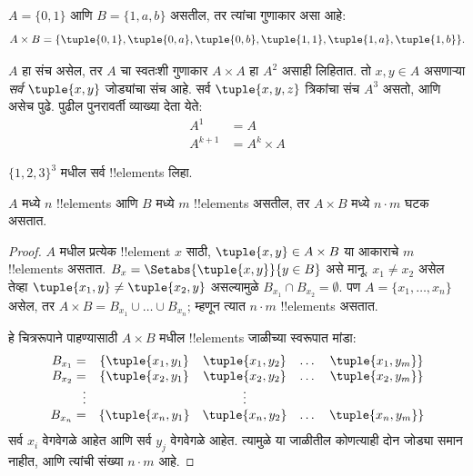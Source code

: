 \documentclass[../../../include/open-logic-section]{subfiles}
\begin{document}
\begin{ex}
$A = \{0, 1\}$ आणि $B = \{1, a, b\}$ असतील, तर त्यांचा गुणाकार असा आहे:
\[
A \times B = \{ \tuple{0, 1}, \tuple{0, a}, \tuple{0, b},
    \tuple{1, 1}, \tuple{1, a}, \tuple{1, b} \}.
\]
\end{ex}

\begin{ex}
$A$ हा संच असेल, तर $A$ चा स्वतःशी गुणाकार $A \times A$ हा $A^2$
असाही लिहितात. तो $x, y \in A$ असणाऱ्या \emph{सर्व} $\tuple{x, y}$ जोड्यांचा
संच आहे. सर्व $\tuple{x, y, z}$ त्रिकांचा संच $A^3$ असतो, आणि असेच पुढे.
पुढील पुनरावर्ती व्याख्या देता येते:
\begin{align*}
  A^1 & = A\\
  A^{k+1} & = A^k \times A
\end{align*}
\end{ex}

\begin{prob}
$\{1, 2, 3\}^3$ मधील सर्व !!{element}s लिहा.
\end{prob}

\begin{prop}
$A$ मध्ये $n$ !!{element}s आणि $B$ मध्ये $m$ !!{element}s असतील,
तर $A
\times B$ मध्ये $n\cdot m$ घटक असतात.
\end{prop}

\begin{proof}
$A$ मधील प्रत्येक !!{element} $x$ साठी, $\tuple{x, y} \in A \times B$
या आकाराचे $m$ !!{element}s असतात.
$B_x = \Setabs{\tuple{x, y}}{y
  \in B}$ असे मानू. $x_1 \neq x_2$ असेल तेव्हा $\tuple{x_1, y} \neq
\tuple{x_2, y}$ असल्यामुळे $B_{x_1} \cap B_{x_2} = \emptyset$.
पण $A = \{x_1,
\dots, x_n\}$ असेल, तर $A \times B = B_{x_1} \cup \dots \cup B_{x_n}$;
म्हणून त्यात $n\cdot m$ !!{element}s असतात.

हे चित्ररूपाने पाहण्यासाठी $A \times B$ मधील !!{element}s जाळीच्या स्वरूपात मांडा:
\[
\begin{array}{rcccc}
  B_{x_1} = & \{\tuple{x_1, y_1} & \tuple{x_1, y_2} & \dots & \tuple{x_1, y_m}\}\\
  B_{x_2} = & \{\tuple{x_2, y_1} & \tuple{x_2, y_2} & \dots & \tuple{x_2, y_m}\}\\
  \vdots & & \vdots\\
  B_{x_n} = & \{\tuple{x_n, y_1} & \tuple{x_n, y_2} & \dots & \tuple{x_n, y_m}\}
\end{array}
\]
सर्व $x_i$ वेगवेगळे आहेत आणि सर्व $y_j$ वेगवेगळे आहेत. त्यामुळे या जाळीतील
कोणत्याही दोन जोड्या समान नाहीत, आणि त्यांची संख्या $n\cdot m$ आहे.
\end{proof}
\end{document}
